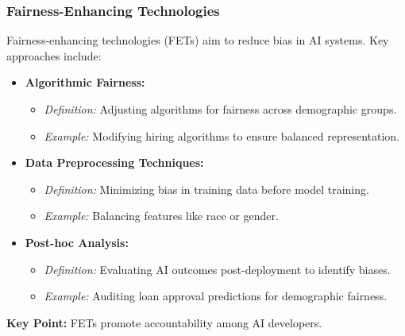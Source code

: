 \documentclass{beamer}
\begin{document}
\begin{frame}[fragile]
    \frametitle{Fairness-Enhancing Technologies}
    Fairness-enhancing technologies (FETs) aim to reduce bias in AI systems. Key approaches include:
    \begin{itemize}
        \item \textbf{Algorithmic Fairness:} 
            \begin{itemize}
                \item \textit{Definition:} Adjusting algorithms for fairness across demographic groups.
                \item \textit{Example:} Modifying hiring algorithms to ensure balanced representation.
            \end{itemize}
        \item \textbf{Data Preprocessing Techniques:}
            \begin{itemize}
                \item \textit{Definition:} Minimizing bias in training data before model training.
                \item \textit{Example:} Balancing features like race or gender.
            \end{itemize}
        \item \textbf{Post-hoc Analysis:}
            \begin{itemize}
                \item \textit{Definition:} Evaluating AI outcomes post-deployment to identify biases.
                \item \textit{Example:} Auditing loan approval predictions for demographic fairness.
            \end{itemize}
    \end{itemize}
    \textbf{Key Point:} FETs promote accountability among AI developers.
\end{frame}
\end{document}
